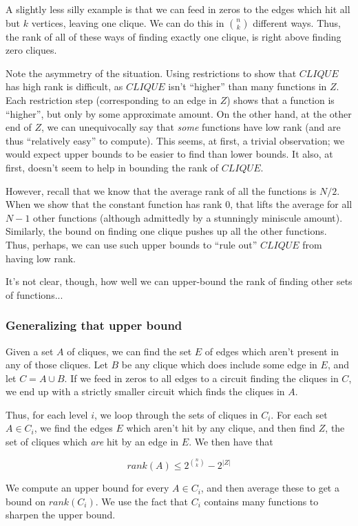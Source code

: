 \documentclass[12pt]{article}
\theoremstyle{definition}
\begin{document}
A slightly less silly example is that we can feed in zeros to 
the edges which hit all but $k$ vertices, leaving one clique.
We can do this in ${n \choose k}$ different ways. Thus, the rank
of all of these ways of finding exactly one clique, is right above
finding zero cliques.

Note the asymmetry of the situation. Using restrictions to show that
$CLIQUE$ has high rank is difficult, as $CLIQUE$ isn't ``higher'' than
many functions in $Z$. Each restriction step (corresponding to an edge in $Z$)
shows that a function is
``higher'', but only by some approximate amount.
On the other hand, at the other end of $Z$, we can unequivocally say
that {\em some} functions have low rank (and are thus
``relatively easy'' to compute).
This seems, at first, a trivial observation; we would expect upper bounds
to be easier to find than lower bounds. It also, at first, doesn't seem
to help in bounding the rank of $CLIQUE$.

However, recall that we know that the average rank of all the functions
is $N/2$.
When we show that the constant function has rank 0, that lifts
the average for all $N-1$ other functions (although admittedly
by a stunningly miniscule amount).
Similarly, the bound on finding one clique pushes up all the other functions.
Thus, perhaps, we can use such upper bounds to ``rule out'' $CLIQUE$ from
having low rank.

It's not clear, though, how well we can upper-bound the rank
of finding other sets of functions...

\subsubsection{Generalizing that upper bound}

Given a set $A$ of cliques, we
can find the set $E$ of edges which aren't present in any of those cliques.
Let $B$ be any clique which does include some edge in $E$, and let
$C = A \cup B$. If we feed in zeros to all edges to a circuit
finding the cliques in $C$, we end up with a strictly smaller circuit 
which finds the cliques in $A$.

Thus, for each level $i$, we loop through the sets of cliques in $C_i$.
For each set $A \in C_i$, we find the edges $E$ which aren't hit by any clique, and then
find $Z$, the set of cliques which {\em are} hit by an edge in $E$.
We then have that 

\[
rank(A) \le 2^{n \choose k} - 2^{|Z|}
\]

We compute an upper bound for every $A \in C_i$, and then average these
to get a bound on $rank(C_i)$. We use the fact that $C_i$ contains many
functions to sharpen the upper bound.
\end{document}
